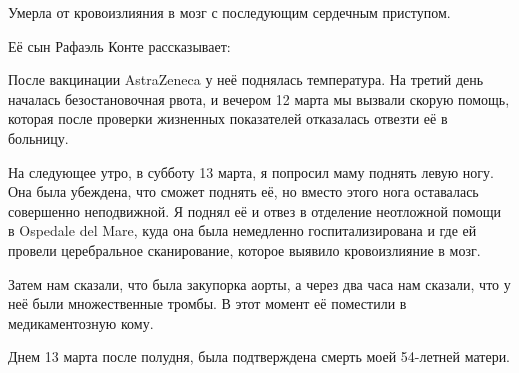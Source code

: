 Умерла от кровоизлияния в мозг с последующим сердечным приступом.

Её сын Рафаэль Конте рассказывает:

После вакцинации AstraZeneca у неё поднялась температура. На третий день
началась безостановочная рвота, и вечером 12 марта мы вызвали скорую помощь,
которая после проверки жизненных показателей отказалась отвезти её в больницу.

На следующее утро, в субботу 13 марта, я попросил маму поднять левую ногу. Она
была убеждена, что сможет поднять её, но вместо этого нога оставалась совершенно
неподвижной. Я поднял её и отвез в отделение неотложной помощи в Ospedale del
Mare, куда она была немедленно госпитализирована и где ей провели церебральное
сканирование, которое выявило кровоизлияние в мозг.

Затем нам сказали, что была закупорка аорты, а через два часа нам сказали, что у
неё были множественные тромбы. В этот момент её поместили в медикаментозную
кому.

Днем 13 марта после полудня, была подтверждена смерть моей 54-летней матери.
